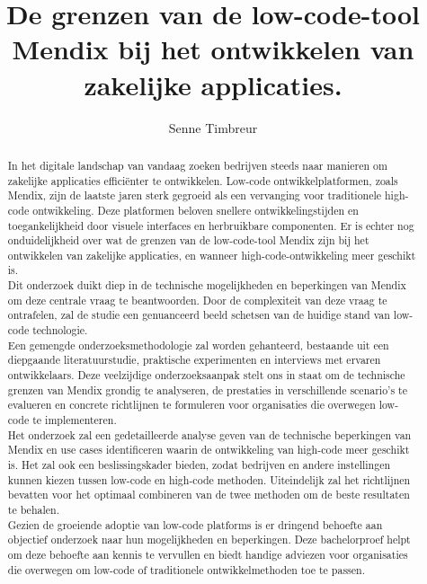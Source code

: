 \documentclass{hogent-article}
\title{De grenzen van de low-code-tool Mendix bij het ontwikkelen van zakelijke applicaties.}
\author{Senne Timbreur}
\begin{document}
    
    \begin{abstract}
        In het digitale landschap van vandaag zoeken bedrijven steeds naar manieren om zakelijke applicaties efficiënter te ontwikkelen. Low-code ontwikkelplatformen, zoals Mendix, zijn de laatste jaren sterk gegroeid als een vervanging voor traditionele high-code ontwikkeling. Deze platformen beloven snellere ontwikkelingstijden en toegankelijkheid door visuele interfaces en herbruikbare componenten. Er is echter nog onduidelijkheid over wat de grenzen van de low-code-tool Mendix zijn bij het ontwikkelen van zakelijke applicaties, en wanneer high-code-ontwikkeling meer geschikt is.
        \\
        Dit onderzoek duikt diep in de technische mogelijkheden en beperkingen van Mendix om deze centrale vraag te beantwoorden. Door de complexiteit van deze vraag te ontrafelen, zal de studie een genuanceerd beeld schetsen van de huidige stand van low-code technologie.
        \\
        Een gemengde onderzoeksmethodologie zal worden gehanteerd, bestaande uit een diepgaande literatuurstudie, praktische experimenten en interviews met ervaren ontwikkelaars. Deze veelzijdige onderzoeksaanpak stelt ons in staat om de technische grenzen van Mendix grondig te analyseren, de prestaties in verschillende scenario's te evalueren en concrete richtlijnen te formuleren voor organisaties die overwegen low-code te implementeren.
        \\
        Het onderzoek zal een gedetailleerde analyse geven van de technische beperkingen van Mendix en use cases identificeren waarin de ontwikkeling van high-code meer geschikt is. Het zal ook een beslissingskader bieden, zodat bedrijven en andere instellingen kunnen kiezen tussen low-code en high-code methoden. Uiteindelijk zal het richtlijnen bevatten voor het optimaal combineren van de twee methoden om de beste resultaten te behalen.
        \\
        Gezien de groeiende adoptie van low-code platforms is er dringend behoefte aan objectief onderzoek naar hun mogelijkheden en beperkingen. Deze bachelorproef helpt om deze behoefte aan kennis te vervullen en biedt handige adviezen voor organisaties die overwegen om low-code of traditionele ontwikkelmethoden toe te passen.
    \end{abstract}
    
    \tableofcontents
    
    
    
    \printbibliography[heading=bibintoc]
    
\end{document}
